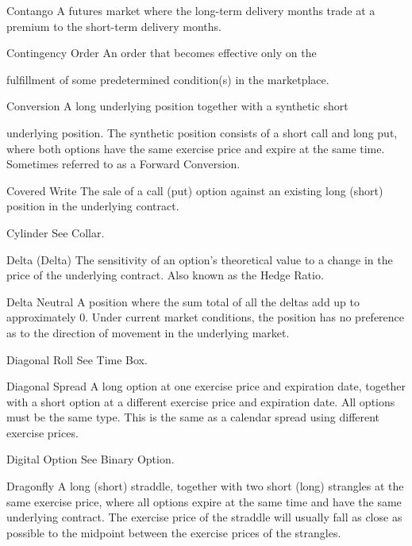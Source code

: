 Contango A futures market where the long-term delivery months trade at a premium to the short-term delivery months.\par
Contingency Order An  order  that becomes  effective  only on  the\par
fulfillment of some predetermined condition(s) in the marketplace.\par
Conversion A long underlying position together with a synthetic short\par
underlying position. The synthetic position consists of a short call and long put, where both options have the same exercise price and expire at the same time. Sometimes referred to as a Forward Conversion.\par
Covered Write The sale of a call (put) option against an existing long (short) position in the underlying contract.\par
Cylinder See Collar.\par
Delta (Delta) The sensitivity of an option's theoretical value to a change in the price of the underlying contract. Also known as the Hedge Ratio.\par
Delta Neutral A position where the sum total of all the deltas add up to approximately 0. Under current market conditions, the position has no preference as to the direction of movement in the underlying market.\par
Diagonal Roll See Time Box.\par
Diagonal Spread A long option at one exercise price and expiration date, together with a short option at a different exercise price and expiration date. All options must be the same type. This is the same as a calendar spread using different exercise prices.\par
Digital Option See Binary Option.\par
Dragonfly A long (short) straddle, together with two short (long) strangles at the same exercise price, where all options expire at the same time and have the same underlying contract. The exercise price of the straddle will usually fall as close as possible to the midpoint between the exercise prices of the strangles.\par

